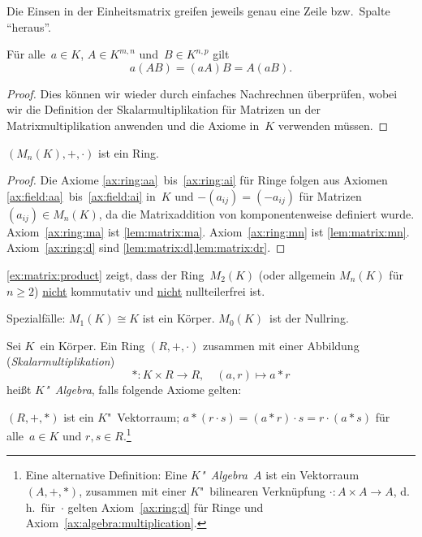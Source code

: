 \documentclass[a4paper]{article}
\begin{document}
Die Einsen in der Einheitsmatrix greifen jeweils genau eine Zeile bzw.\ Spalte "`heraus"'.

\begin{lemma}\label{lem:matrix:multiplication}
    Für alle~$a \in K$, $A \in K^{m,n}$ und~$B \in K^{n,p}$ gilt
    \begin{equation*}
        a(AB) = (aA)B = A(aB).
    \end{equation*}
\end{lemma}

\begin{proof}
    Dies können wir wieder durch einfaches Nachrechnen überprüfen, wobei wir die Definition der Skalarmultiplikation für Matrizen un der Matrixmultiplikation anwenden und die Axiome in~$K$ verwenden müssen.
\end{proof}

\begin{lemma}
    $(M_n(K),+,\cdot)$ ist ein Ring.
\end{lemma}

\begin{proof}
    Die Axiome \ref{ax:ring:aa}~bis~\ref{ax:ring:ai} für Ringe folgen aus Axiomen \ref{ax:field:aa}~bis~\ref{ax:field:ai} in~$K$ und $-(a_{ij}) = (-a_{ij})$ für Matrizen~$(a_{ij}) \in M_n(K)$, da die Matrixaddition von komponentenweise definiert wurde. Axiom~\ref{ax:ring:ma} ist \cref{lem:matrix:ma}. Axiom~\ref{ax:ring:mn} ist \cref{lem:matrix:mn}. Axiom~\ref{ax:ring:d} sind \cref{lem:matrix:dl,lem:matrix:dr}.
\end{proof}

\begin{remark}
    \cref{ex:matrix:product} zeigt, dass der Ring~$M_2(K)$ (oder allgemein $M_n(K)$ für~$n \geq 2$) \underline{nicht} kommutativ und \underline{nicht} nullteilerfrei ist.

    Spezialfälle: $M_1(K) \cong K$ ist ein Körper. $M_0(K)$~ist der Nullring.
\end{remark}

\begin{axiom}[Algebra]
    Sei $K$~ein Körper. Ein Ring $(R,+,\cdot)$ zusammen mit einer Abbildung (\emph{Skalarmultiplikation})
    \begin{equation*}
        *\colon K\times R \to R,\quad (a,r) \mapsto a*r
    \end{equation*}
    heißt \emph{$K$"~Algebra}, falls folgende Axiome gelten:
    \begin{enumerate}[widest=(AL0), leftmargin=*]
         $(R,+,*)$ ist ein $K$"~Vektorraum;\label{ax:algebra:vecspace}
         $a*(r\cdot s) = (a*r)\cdot s = r\cdot(a*s)$ für alle~$a \in K$ und $r,s \in R$.\label{ax:algebra:multiplication}\footnote{Eine alternative Definition: Eine \emph{$K$"~Algebra~$A$} ist ein Vektorraum $(A,+,*)$, zusammen mit einer $K$"~bilinearen Verknüpfung $\cdot\colon A\times A \to A$, d.\,h.\ für~$\cdot$ gelten Axiom~\ref{ax:ring:d} für Ringe und Axiom~\ref{ax:algebra:multiplication}.}
    \end{enumerate}
\end{axiom}
\end{document}
